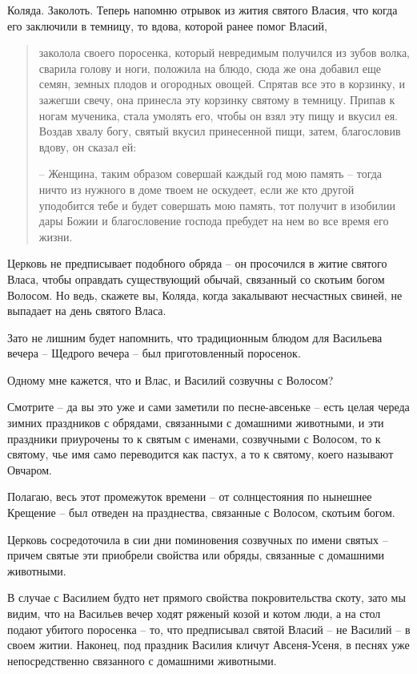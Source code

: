    Коляда. Заколоть. Теперь напомню отрывок из жития святого Власия, что когда его заключили в темницу, то вдова, которой ранее помог Власий,

\begin{quotation}
заколола своего поросенка, который невредимым получился из зубов волка, сварила голову и ноги, положила на блюдо, сюда же она добавил еще семян, земных плодов и огородных овощей. Спрятав все это в корзинку, и зажегши свечу, она принесла эту корзинку святому в темницу. Припав к ногам мученика, стала умолять его, чтобы он взял эту пищу и вкусил ея. Воздав хвалу богу, святый вкусил принесенной пищи, затем, благословив вдову, он сказал ей:

 – Женщина, таким образом совершай каждый год мою память – тогда ничто из нужного в доме твоем не оскудеет, если же кто другой уподобится тебе и будет совершать мою память, тот получит в изобилии дары Божии и благословение господа пребудет на нем во все время его жизни.
\end{quotation}

   Церковь не предписывает подобного обряда – он просочился в житие святого Власа, чтобы оправдать существующий обычай, связанный со скотьим богом Волосом. Но ведь, скажете вы, Коляда, когда закалывают несчастных свиней, не выпадает на день святого Власа.

    Зато не лишним будет напомнить, что традиционным блюдом для Васильева вечера – Щедрого вечера – был приготовленный поросенок.

   Одному мне кажется, что и Влас, и Василий созвучны с Волосом?

   Смотрите – да вы это уже и сами заметили по песне-авсеньке – есть целая череда зимних праздников с обрядами, связанными с домашними животными, и эти праздники приурочены то к святым с именами, созвучными с Волосом, то к святому, чье имя само переводится как пастух, а то к святому, коего называют Овчаром.

   Полагаю, весь этот промежуток времени – от солнцестояния по нынешнее Крещение – был отведен на празднества, связанные с Волосом, скотьим богом.

   Церковь сосредоточила в сии дни поминовения созвучных по имени святых – причем святые эти приобрели свойства или обряды, связанные с домашними животными.

   В случае с Василием будто нет прямого свойства покровительства скоту, зато мы видим, что на Васильев вечер ходят ряженый козой и котом люди, а на стол подают убитого поросенка – то, что предписывал святой Власий – не Василий – в своем житии. Наконец, под праздник Василия кличут Авсеня-Усеня, в песнях уже непосредственно связанного с домашними животными.

